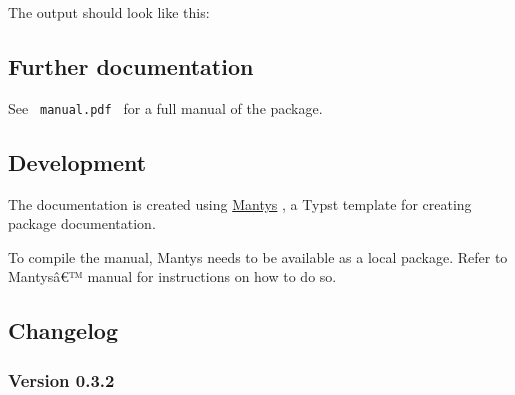\begin{Shaded}
\begin{Highlighting}[]
\OperatorTok{:}

\NormalTok{\#}\NormalTok{((}
\OperatorTok{:}\OperatorTok{:}\OperatorTok{,}\OperatorTok{:}\NormalTok{)}\OperatorTok{,}
\OperatorTok{:}\OperatorTok{:}\NormalTok{(}\OperatorTok{,}\NormalTok{)}\OperatorTok{,}\OperatorTok{:}\NormalTok{)}\OperatorTok{,}
\OperatorTok{:}\NormalTok{ ()}\OperatorTok{,}
\NormalTok{))}
\end{Highlighting}
\end{Shaded}

The output should look like this:

\subsection{Further documentation}\label{further-documentation}

See \texttt{\ manual.pdf\ } for a full manual of the package.

\subsection{Development}\label{development}

The documentation is created using
\href{https://github.com/jneug/typst-mantys}{Mantys} , a Typst template
for creating package documentation.

To compile the manual, Mantys needs to be available as a local package.
Refer to Mantysâ€™ manual for instructions on how to do so.

\subsection{Changelog}\label{changelog}

\subsubsection{Version 0.3.2}\label{version-0.3.2}

